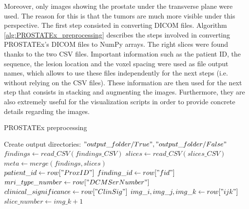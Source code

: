 Moreover, only images showing the prostate under the transverse plane were used. The reason for this is that the tumors are much more visible under this perspective. 
The first step consisted in converting DICOM files. Algorithm \ref{alg:PROSTATEx_preprocessing} describes the steps involved in converting PROSTATEx's DICOM files to NumPy arrays. The right slices were found thanks to the two CSV files. Important information such as the patient ID, the sequence, the lesion location and the voxel spacing were used as file output names, which allows to use these files independently for the next steps (i.e. without relying on the CSV files). These information are then used for the next step that consists in stacking and augmenting the images. Furthermore, they are also extremely useful for the visualization scripts in order to provide concrete details regarding the images.

\begin{algorithm}
    \caption{PROSTATEx preprocessing}
    \label{alg:PROSTATEx_preprocessing}
    \begin{algorithmic}[1] %
        		\State Create output directories: $"output\_folder/True", "output\_folder/False"$\\
        		\State $findings \gets read\_CSV(findings\_CSV)$ 
        		\State $slices \gets read\_CSV(slices\_CSV)$ 
			\State $meta \gets merge(findings, slices)$\\
            		\State $patient\_id \gets row["ProxID"]$
            		\State $finding\_id \gets row["fid"]$
            		\State $mri\_type\_number \gets row["DCMSerNumber"]$
            		\State $clinical\_significance \gets row["ClinSig"]$
            		\State $img\_i, img\_j, img\_k \gets row["ijk"]$
            		\State $slice\_number \gets img\_k + 1$ \\
                						 
                					\EndIf
                				\EndFor
                			\EndIf
            			\EndFor
            		\EndFor
            \EndFor
        \EndProcedure
    \end{algorithmic}
\end{algorithm} 

